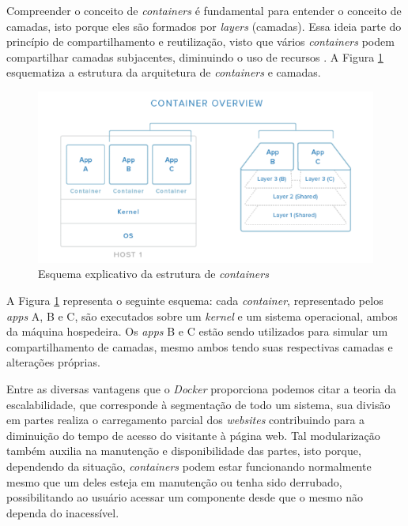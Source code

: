 Compreender o conceito de \textit{containers} é fundamental para entender o conceito de camadas, isto porque eles são formados por \textit{layers} (camadas). Essa ideia parte do princípio de compartilhamento e reutilização, visto que vários \textit{containers} podem compartilhar camadas subjacentes, diminuindo o uso de recursos \cite{prada4docker}. A Figura \ref{containers} esquematiza a estrutura da arquitetura de \textit{containers} e camadas.

\newpage

\begin{figure}[htb]
 \centering
 \caption{Esquema explicativo da estrutura de \textit{containers}}
 \includegraphics[scale=0.6]{figuras/containers}
 
 \label{containers}
\end{figure}

A Figura \ref{containers} representa o seguinte esquema: cada \textit{container}, representado pelos \textit{apps} A, B e C, são executados sobre um \textit{kernel} e um sistema operacional, ambos da máquina hospedeira. Os \textit{apps} B e C estão sendo utilizados para simular um compartilhamento de camadas, mesmo ambos tendo suas respectivas camadas e alterações próprias.

Entre as diversas vantagens que o \textit{Docker} proporciona podemos citar a teoria da escalabilidade, que corresponde à segmentação de todo um sistema, sua divisão em partes realiza o carregamento parcial dos \textit{websites} contribuindo para a diminuição do tempo de acesso do visitante à página web. Tal modularização também auxilia na manutenção e disponibilidade das partes, isto porque, dependendo da situação, \textit{containers} podem estar funcionando normalmente mesmo que um deles esteja em manutenção ou tenha sido derrubado, possibilitando ao usuário acessar um componente desde que o mesmo não dependa do inacessível. 

